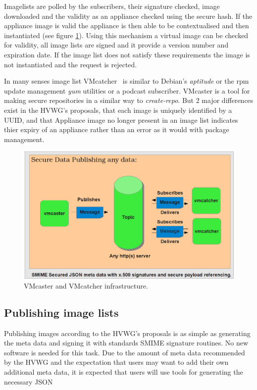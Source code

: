 \documentclass{llncs_Ibergrid2013}
\begin{document}
Imagelists are polled by the subscribers, their signature checked, image downloaded and the validity as an appliance checked using the secure hash. If the appliance image is valid the appliance is then able to be contextualised and then instantiated (see figure \ref{fig:infrastructure}). 
Using this mechanism a virtual image can be checked for validity, all image lists are signed and it provide a version number and expiration date. If the image list does not satisfy these requirements the image is not instantiated and the request is rejected.

In many senses image list VMcatcher~\cite{vmcatcher} is similar to Debian's \textit{aptitude} or the rpm update management \textit{yum} utilities or a podcast subscriber. VMcaster is a tool for making secure repositories in a similar way to \textit{create-repo}. But 2 major differences exist in the HVWG's proposals, that each image is uniquely identified by a UUID, and that Appliance image no longer present in an image list indicates thier expiry of an appliance rather than an error as it would with package management.

\begin{figure}[h]
\centering
\includegraphics[width=1\textwidth]{vmcaster_vmcatcher.png}
\caption{VMcaster and VMcatcher infrastructure.}
\label{fig:infrastructure}
\end{figure}

\subsection{Publishing image lists}
Publishing images according to the HVWG's proposals is as simple as generating the meta data and signing it with standards SMIME signature routines. No new software is needed for this task. Due to the amount of meta data recommended by the HVWG and the expectation that users may want to add their own additional meta data, it is expected that users will use tools for generating the necessary JSON 
\end{document}
